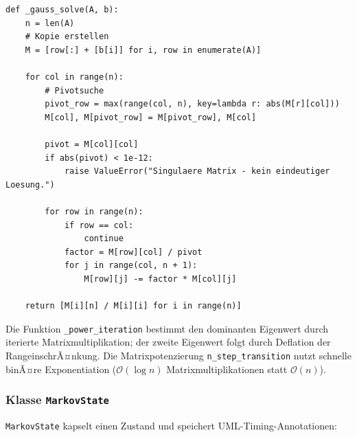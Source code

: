 ﻿\documentclass[a4paper,12pt]{scrreprt}
\theoremstyle{definition}
\begin{document}
\begin{lstlisting}[style=python, caption={GauÃŸ-Elimination mit Spaltenpivotisierung (Kernfunktion)}, label=lst:gauss]
def _gauss_solve(A, b):
    n = len(A)
    # Kopie erstellen
    M = [row[:] + [b[i]] for i, row in enumerate(A)]

    for col in range(n):
        # Pivotsuche
        pivot_row = max(range(col, n), key=lambda r: abs(M[r][col]))
        M[col], M[pivot_row] = M[pivot_row], M[col]

        pivot = M[col][col]
        if abs(pivot) < 1e-12:
            raise ValueError("Singulaere Matrix - kein eindeutiger Loesung.")

        for row in range(n):
            if row == col:
                continue
            factor = M[row][col] / pivot
            for j in range(col, n + 1):
                M[row][j] -= factor * M[col][j]

    return [M[i][n] / M[i][i] for i in range(n)]
\end{lstlisting}

Die Funktion \texttt{\_power\_iteration} bestimmt den dominanten Eigenwert
durch iterierte Matrixmultiplikation; der zweite Eigenwert folgt durch
Deflation der RangeinschrÃ¤nkung. Die Matrixpotenzierung
\texttt{n\_step\_transition} nutzt schnelle binÃ¤re Exponentiation
($\mathcal{O}(\log n)$ Matrixmultiplikationen statt $\mathcal{O}(n)$).

\subsubsection{Klasse \texttt{MarkovState}}

\texttt{MarkovState} kapselt einen Zustand und speichert UML-Timing-Annotationen:
\end{document}
